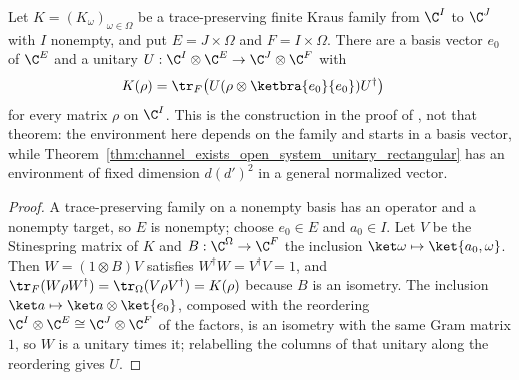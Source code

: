 \begin{theorem}
    \label{thm:kraus_family_unitary_dilation}
    \leanok
    Let $K=(K_\omega)_{\omega\in\Omega}$ be a trace-preserving finite Kraus family from
    $\C^I$ to $\C^J$ with $I$ nonempty, and put $E=J\times\Omega$ and $F=I\times\Omega$.
    There are a basis vector $e_0$ of $\C^E$ and a unitary
    $U:\C^I\otimes\C^E\to\C^J\otimes\C^F$ with
    \begin{align}
        K(\rho)&=\tr_F\bigl(U(\rho\otimes\ketbra{e_0}{e_0})U^\dagger\bigr)
        \label{eq:kraus_family_unitary_dilation}
    \end{align}
    for every matrix $\rho$ on $\C^I$. This is the construction in the proof of
    \cite[Theorem~2.5]{Wolf2012Quantum}, not that theorem: the environment here depends on
    the family and starts in a basis vector, while
    Theorem~\ref{thm:channel_exists_open_system_unitary_rectangular} has an environment of
    fixed dimension $d(d')^2$ in a general normalized vector.
\end{theorem}
\begin{proof}\leanok
    A trace-preserving family on a nonempty basis has an operator and a nonempty
    target, so $E$ is nonempty; choose $e_0\in E$ and $a_0\in I$. Let $V$ be the
    Stinespring matrix of $K$ and $B:\C^\Omega\to\C^F$ the inclusion
    $\ket\omega\mapsto\ket{a_0,\omega}$. Then $W=(1\otimes B)V$ satisfies
    $W^\dagger W=V^\dagger V=1$, and $\tr_F(W\rho W^\dagger)=\tr_\Omega(V\rho V^\dagger)=K(\rho)$
    because $B$ is an isometry. The inclusion $\ket a\mapsto\ket a\otimes\ket{e_0}$,
    composed with the reordering $\C^I\otimes\C^E\cong\C^J\otimes\C^F$ of the factors, is
    an isometry with the same Gram matrix $1$, so $W$ is a unitary times it; relabelling
    the columns of that unitary along the reordering gives $U$.
\end{proof}

